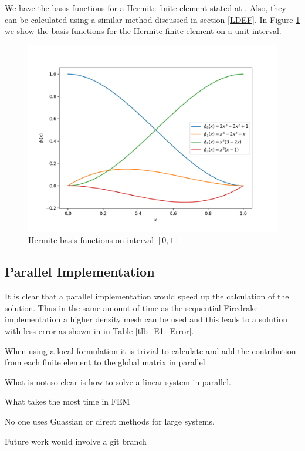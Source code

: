 \documentclass[12pt]{ociamthesis}
\begin{document}
We have the basis functions for a Hermite finite element stated at \cite{defelement}. Also, they can be calculated using a similar method discussed in section \ref{LDEF}. In Figure \ref{InterFuncsHER} we show the basis functions for the Hermite finite element on a unit interval.

\begin{figure}[H]
     \includegraphics[width=\textwidth]{Pics/BasisFunc/IntervalFuncsHER.png}
     \caption{Hermite basis functions on interval $[0,1]$}
     \label{InterFuncsHER}
\end{figure}

\subsection{Parallel Implementation} \label{GMRES_GPU}
It is clear that a parallel implementation would speed up the calculation of the solution. Thus in the same amount of time as the sequential Firedrake implementation a higher density mesh can be used and this leads to a solution with less error as shown in in Table \ref{tlb_E1_Error}.

When using a local formulation it is trivial to calculate and add the contribution from each finite element to the global matrix in parallel.

What is not so clear is how to solve a linear system in parallel. 

What takes the most time in FEM

No one uses Guassian or direct methods for large systems.

Future work would involve a git branch 
\end{document}
